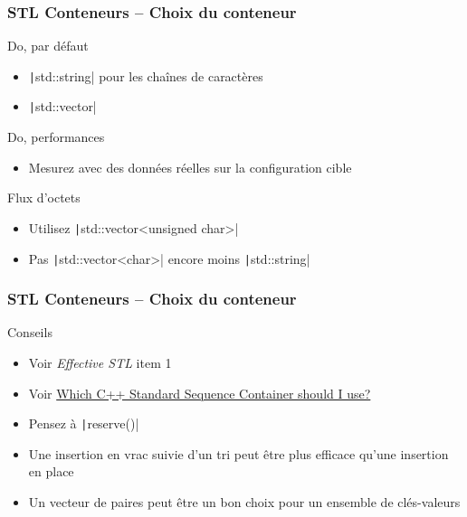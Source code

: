 \documentclass[C++.tex]{subfiles}
\begin{document}
\begin{frame}[fragile]
	\frametitle{STL Conteneurs -- Choix du conteneur}
	\begin{exampleblock}{Do, par défaut}
		\begin{itemize}
			\item \texttt|std::string| pour les chaînes de caractères
			\item \texttt|std::vector|
		\end{itemize}
	\end{exampleblock}

	\begin{exampleblock}{Do, performances}
		\begin{itemize}
			\item Mesurez avec des données réelles sur la configuration cible
		\end{itemize}
	\end{exampleblock}

	\begin{alertblock}{Flux d'octets}
		\begin{itemize}
			\item Utilisez \texttt|std::vector<unsigned char>|
			\item Pas \texttt|std::vector<char>| encore moins \texttt|std::string|
		\end{itemize}
	\end{alertblock}
\end{frame}

\begin{frame}[fragile]
	\frametitle{STL Conteneurs -- Choix du conteneur}
	\begin{block}{Conseils}
		\begin{itemize}
			\item Voir \textit{Effective STL} item 1
			\item Voir \href{https://hackingcpp.com/cpp/design/which_std_sequence_container.png}{Which C++ Standard Sequence Container should I use?\linklogo}
			\item Pensez à \texttt|reserve()|
			\item Une insertion en vrac suivie d'un tri peut être plus efficace qu'une insertion en place
			\item Un vecteur de paires peut être un bon choix pour un ensemble de clés-valeurs
		\end{itemize}
	\end{block}
\end{frame}
\end{document}
